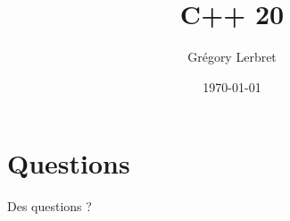 \documentclass[t, 10pt]{beamer}
\author{Grégory Lerbret}
\title{C++ 20}
\date{\today}
\begin{document}
\frame[plain]{\maketitle}



\section*{Questions}
\begin{frame}[c]
	\begin{center}
		\huge Des questions ?
	\end{center}
\end{frame}


\end{document}
